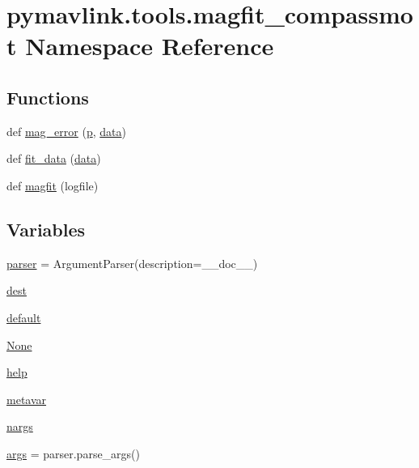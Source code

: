 \hypertarget{namespacepymavlink_1_1tools_1_1magfit__compassmot}{}\section{pymavlink.\+tools.\+magfit\+\_\+compassmot Namespace Reference}
\label{namespacepymavlink_1_1tools_1_1magfit__compassmot}
\subsection*{Functions}
\begin{DoxyCompactItemize}
\item 
def \mbox{\hyperlink{namespacepymavlink_1_1tools_1_1magfit__compassmot_aef60c4b23f3dd9f2d641a0ab945a42c0}{mag\+\_\+error}} (\mbox{\hyperlink{velTest_8cpp_a739e18b8b6d072d434ebcb6ca486abb0}{p}}, \mbox{\hyperlink{structdata}{data}})
\item 
def \mbox{\hyperlink{namespacepymavlink_1_1tools_1_1magfit__compassmot_a32d23384645c90665aa534be4601f5f6}{fit\+\_\+data}} (\mbox{\hyperlink{structdata}{data}})
\item 
def \mbox{\hyperlink{namespacepymavlink_1_1tools_1_1magfit__compassmot_aa090e8c3a6ed31f44d97b9049111e60a}{magfit}} (logfile)
\end{DoxyCompactItemize}
\subsection*{Variables}
\begin{DoxyCompactItemize}
\item 
\mbox{\hyperlink{namespacepymavlink_1_1tools_1_1magfit__compassmot_a071302708a7361941decf9fb8e3487ea}{parser}} = Argument\+Parser(description=\+\_\+\+\_\+doc\+\_\+\+\_\+)
\item 
\mbox{\hyperlink{namespacepymavlink_1_1tools_1_1magfit__compassmot_a1efdd4982f16820d417d44144f0f1905}{dest}}
\item 
\mbox{\hyperlink{namespacepymavlink_1_1tools_1_1magfit__compassmot_a74e6bf71ce5fbc626680d83d0d0127f8}{default}}
\item 
\mbox{\hyperlink{namespacepymavlink_1_1tools_1_1magfit__compassmot_a8d68794cdbaf1412023f2e05b42da8df}{None}}
\item 
\mbox{\hyperlink{namespacepymavlink_1_1tools_1_1magfit__compassmot_a768efd61f023051c8b553e38c5505613}{help}}
\item 
\mbox{\hyperlink{namespacepymavlink_1_1tools_1_1magfit__compassmot_a3f320585acfa4624e3b8a0d7ffc869bd}{metavar}}
\item 
\mbox{\hyperlink{namespacepymavlink_1_1tools_1_1magfit__compassmot_ae297c62d12af322c8648472bd5d785a0}{nargs}}
\item 
\mbox{\hyperlink{namespacepymavlink_1_1tools_1_1magfit__compassmot_ad7f494a8186661e76dc89230990af9e5}{args}} = parser.\+parse\+\_\+args()
\end{DoxyCompactItemize}


